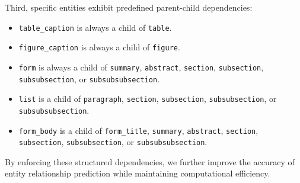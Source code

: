 Third, specific entities exhibit predefined parent-child dependencies:  
\begin{itemize}
    \item \texttt{table\_caption} is always a child of \texttt{table}.  
    \item \texttt{figure\_caption} is always a child of \texttt{figure}.  
    \item \texttt{form} is always a child of \texttt{summary}, \texttt{abstract}, \texttt{section}, \texttt{subsection}, \texttt{subsubsection}, or \texttt{subsubsubsection}.  
    \item \texttt{list} is a child of \texttt{paragraph}, \texttt{section}, \texttt{subsection}, \texttt{subsubsection}, or \texttt{subsubsubsection}.  
    \item \texttt{form\_body} is a child of \texttt{form\_title}, \texttt{summary}, \texttt{abstract}, \texttt{section}, \texttt{subsection}, \texttt{subsubsection}, or \texttt{subsubsubsection}.  
\end{itemize}  
By enforcing these structured dependencies, we further improve the accuracy of entity relationship prediction while maintaining computational efficiency.